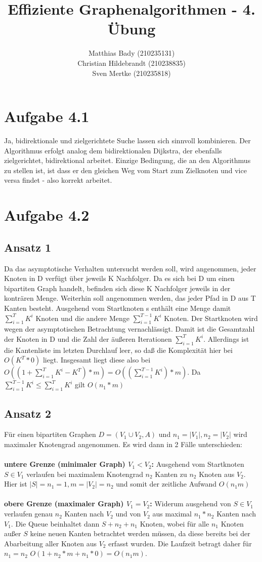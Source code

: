 \documentclass{scrartcl}
\title{Effiziente Graphenalgorithmen - 4. Übung}
\author{Matthias Bady (210235131)\\ Christian Hildebrandt (210238835)\\ Sven Mertke (210235818)}
\begin{document}
\maketitle
\section{Aufgabe 4.1}
Ja, bidirektionale und zielgerichtete Suche lassen sich sinnvoll kombinieren. Der Algorithmus erfolgt analog dem bidirektionalen Dijkstra, der ebenfalls zielgerichtet, bidirektional arbeitet. Einzige Bedingung, die an den Algorithmus zu stellen ist, ist dass er den gleichen Weg vom Start zum Zielknoten und vice versa findet - also korrekt arbeitet.
\section{Aufgabe 4.2}
\subsection*{Ansatz 1}
Da das asymptotische Verhalten untersucht werden soll, wird angenommen, jeder Knoten in D verfügt über jeweils K Nachfolger. Da es sich bei D um einen bipartiten Graph handelt, befinden sich diese K Nachfolger jeweils in der konträren Menge. Weiterhin soll angenommen werden, das jeder Pfad in D aus T Kanten besteht. Ausgehend vom Startknoten s enthält eine Menge damit $\sum_{i=1}^{T}{K^i}$ Knoten und die andere Menge $\sum_{i=1}^{T-1}{K^i}$ Knoten. Der Startknoten wird wegen der asymptotischen Betrachtung vernachlässigt. Damit ist die Gesamtzahl der Knoten in D und die Zahl der äußeren Iterationen $\sum_{i=1}^{T}{K^i}$. Allerdings ist die Kantenliste im letzten Durchlauf leer, so daß die Komplexität hier bei $O(K^T*0)$ liegt. Insgesamt liegt diese also bei $O((1+\sum_{i=1}^{T}{K^i} - K^T)*m) = O((\sum_{i=1}^{T-1}{K^i})*m)$. Da $\sum_{i=1}^{T-1}{K^i} \leq \sum_{i=1}^{T}{K^i}$ gilt $O(n_1*m)$

\subsection*{Ansatz 2}
Für einen bipartiten Graphen $D=(V_1 \cup V_2, A)$ und $n_1=|V_1|, n_2=|V_2|$ wird maximaler Knotengrad angenommen. Es wird dann in 2 Fälle unterschieden:
\\\\
\textbf{untere Grenze (minimaler Graph) $V_1 < V_2$:}
Ausgehend vom Startknoten $S \in V_1$ verlaufen bei maximalem Knotengrad $n_2$ Kanten zu $n_2$ Knoten aus $V_2$. Hier ist \mbox{$|S|=n_1=1, m=|V_2|=n_2$} und somit der zeitliche Aufwand $O(n_{1}m)$
\\\\
\textbf{obere Grenze (maximaler Graph) $V_1 = V_2$:}
Widerum ausgehend von $S \in V_1$ verlaufen genau $n_2$ Kanten nach $V_2$ und von $V_2$ aus maximal $n_1*n_2$ Kanten nach $V_1$. Die Queue beinhaltet dann $S+n_2+n_1$ Knoten, wobei für alle $n_1$ Knoten außer $S$ keine neuen Kanten betrachtet werden müssen, da diese bereits bei der Abarbeitung aller Knoten aus $V_2$ erfasst wurden. Die Laufzeit betragt daher für $n_1=n_2$ \mbox{$O(1+n_2*m+n_1*0)=O(n_{1}m)$}.
\end{document}
